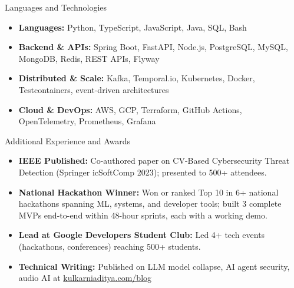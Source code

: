 \documentclass[]{mcdowellcv}
\begin{document}
\begin{cvsection}{Languages and Technologies}
  \begin{cvsubsection}{}{}{}
    \begin{itemize}
      \item \textbf{Languages:} Python, TypeScript, JavaScript, Java, SQL, Bash
      \item \textbf{Backend \& APIs:} Spring Boot, FastAPI, Node.js, PostgreSQL, MySQL, MongoDB, Redis, REST APIs, Flyway
      \item \textbf{Distributed \& Scale:} Kafka, Temporal.io, Kubernetes, Docker, Testcontainers, event-driven architectures
      \item \textbf{Cloud \& DevOps:} AWS, GCP, Terraform, GitHub Actions, OpenTelemetry, Prometheus, Grafana
    \end{itemize}
  \end{cvsubsection}
\end{cvsection}

\begin{cvsection}{Additional Experience and Awards}
  \begin{cvsubsection}{}{}{}
    \begin{itemize}
      \item \textbf{IEEE Published:} Co-authored paper on CV-Based Cybersecurity Threat Detection (Springer icSoftComp 2023); presented to 500+ attendees.
      \item \textbf{National Hackathon Winner:} Won or ranked Top 10 in 6+ national hackathons spanning ML, systems, and developer tools; built 3 complete MVPs end-to-end within 48-hour sprints, each with a working demo.
      \item \textbf{Lead at Google Developers Student Club:} Led 4+ tech events (hackathons, conferences) reaching 500+ students.
      \item \textbf{Technical Writing:} Published on LLM model collapse, AI agent security, audio AI at \href{https://www.kulkarniaditya.com/blog}{kulkarniaditya.com/blog}
    \end{itemize}
  \end{cvsubsection}
\end{cvsection}
\end{document}
